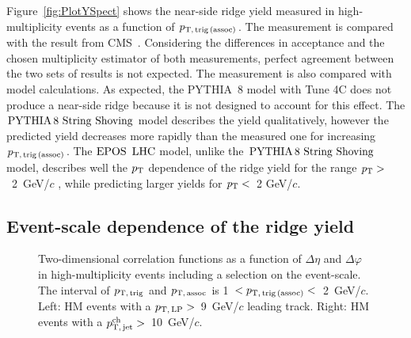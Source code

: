 Figure~\ref{fig:PlotYSpect} shows the near-side ridge yield measured in high-multiplicity events as a function of $p_\mathrm{T,\,trig\,(assoc)}$. The measurement is compared with the result from CMS~\cite{Khachatryan:2015lva}.
Considering the differences in acceptance and the chosen multiplicity estimator of both measurements, perfect agreement between the two sets of results is not expected. The measurement is also compared with model calculations. As expected, the PYTHIA~8 model with Tune 4C does not produce a near-side ridge because it is not designed to account for this effect. The ${\mathrm{PYTHIA}\,8~\mathrm{String}~}\mathrm{Shoving}$ model describes the yield qualitatively, however the predicted yield decreases more rapidly than the measured one for increasing $p_\mathrm{T,\,trig\,(assoc)}$. The ${\mathrm{EPOS}\,~\mathrm{LHC}}$ model, unlike the ${\mathrm{PYTHIA}\,8~\mathrm{String}~}\mathrm{Shoving}$ model, describes well the $p_\mathrm{T}$ dependence of the ridge yield for the range $\it{p}_{\rm{T}}>$~2~GeV/$c$ , while predicting larger yields for $\it{p}_{\rm{T}}<$~2 GeV/$c$.

\subsection{Event-scale dependence of the ridge yield}
\begin{figure}[h!]
	\centering
	\caption{ Two-dimensional correlation functions as a function of $\Delta\eta$ and $\Delta\varphi$ in high-multiplicity events including a selection on the event-scale. The interval of $p_\mathrm{T,\,trig}$ and $p_\mathrm{T,\,assoc}$ is 1~$<p_\mathrm{T,\,trig\,(assoc)}<$~2~GeV/$c$. Left: HM events with a $p_\mathrm{T,\,LP}>$~9~GeV/$c$ leading track. Right: HM events with a $p_\mathrm{T,\,jet}^\mathrm{ch}>$~10~GeV/$c$.}
	\label{fig:PlotCorrHMTSel}
\end{figure}

